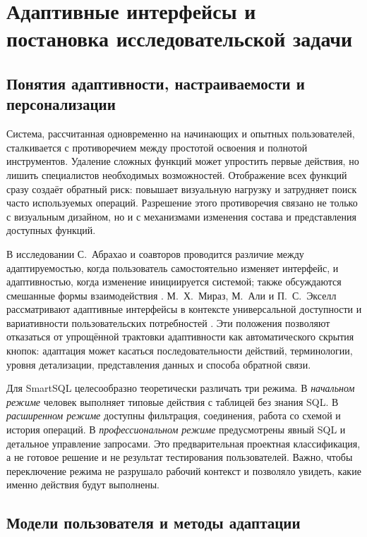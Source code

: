 \clearpage
\section{Адаптивные интерфейсы и постановка исследовательской задачи}
\subsection{Понятия адаптивности, настраиваемости и персонализации}

Система, рассчитанная одновременно на начинающих и опытных пользователей, сталкивается с противоречием между простотой освоения и полнотой инструментов. Удаление сложных функций может упростить первые действия, но лишить специалистов необходимых возможностей. Отображение всех функций сразу создаёт обратный риск: повышает визуальную нагрузку и затрудняет поиск часто используемых операций. Разрешение этого противоречия связано не только с визуальным дизайном, но и с механизмами изменения состава и представления доступных функций.

В исследовании С.~Абрахао и соавторов проводится различие между адаптируемостью, когда пользователь самостоятельно изменяет интерфейс, и адаптивностью, когда изменение инициируется системой; также обсуждаются смешанные формы взаимодействия \cite{abrahao2021}. М.~Х.~Мираз, М.~Али и П.~С.~Экселл рассматривают адаптивные интерфейсы в контексте универсальной доступности и вариативности пользовательских потребностей \cite{miraz2021}. Эти положения позволяют отказаться от упрощённой трактовки адаптивности как автоматического скрытия кнопок: адаптация может касаться последовательности действий, терминологии, уровня детализации, представления данных и способа обратной связи.

Для SmartSQL целесообразно теоретически различать три режима. В \emph{начальном режиме} человек выполняет типовые действия с таблицей без знания SQL. В \emph{расширенном режиме} доступны фильтрация, соединения, работа со схемой и история операций. В \emph{профессиональном режиме} предусмотрены явный SQL и детальное управление запросами. Это предварительная проектная классификация, а не готовое решение и не результат тестирования пользователей. Важно, чтобы переключение режима не разрушало рабочий контекст и позволяло увидеть, какие именно действия будут выполнены.

\subsection{Модели пользователя и методы адаптации}

